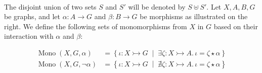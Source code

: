 \begin{notation}
\ \newline
\noindent
\begin{minipage}{0.69\textwidth}
\vspace{2mm}
\noindent  The disjoint union of two sets \( S \) and \( S' \) will be denoted by \( S \uplus S' \). Let \( X, A, B, G \) be graphs, and let \( \alpha \colon A \to G \) and \( \beta \colon B \to G \) be morphisms as illustrated on the right. We define the following sets of monomorphisms from $X$ in $G$ based on their interaction with $\alpha$ and $\beta$:    
\end{minipage}%
\begin{minipage}{0.30\textwidth}
    \hfill
\end{minipage} 
    \begin{align*}
        \operatorname{Mono}(X,G,\alpha) &= \left\{ \iota \colon X \rightarrowtail G \;\middle|\; \exists \zeta \colon X \rightarrowtail A.\, \iota = \zeta \star \alpha \right\}
        \\
        \operatorname{Mono}(X,G,\lnot \alpha) &= \left\{ \iota \colon X \rightarrowtail G \;\middle|\; \nexists \zeta \colon X \rightarrowtail A.\, \iota = \zeta \star \alpha \right\}

\end{align*}
\end{notation}
